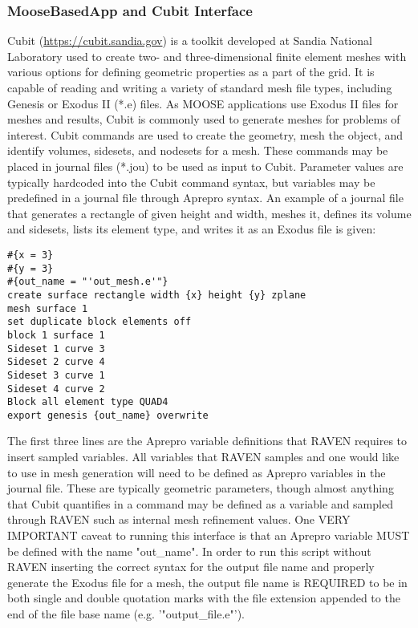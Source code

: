 \subsubsection{MooseBasedApp and Cubit Interface}
Cubit (\url{https://cubit.sandia.gov}) is a toolkit developed at Sandia National 
Laboratory used to create two- and three-dimensional finite element meshes with 
various options for defining geometric properties as a part of the grid. It is 
capable of reading and writing a variety of standard mesh file types, including 
Genesis or Exodus II (*.e) files.  As MOOSE applications use Exodus II files for 
meshes and results, Cubit is commonly used to generate meshes for problems of 
interest.  Cubit commands are used to create the geometry, mesh the object, and 
identify volumes, sidesets, and nodesets for a mesh.  These commands may be 
placed in journal files (*.jou) to be used as input to Cubit.  Parameter values 
are typically hardcoded into the Cubit command syntax, but variables may be 
predefined in a journal file through Aprepro syntax.  An example of a journal 
file that generates a rectangle of given height and width, meshes it, defines its 
volume and sidesets, lists its element type, and writes it as an Exodus file is given:

\begin{lstlisting}
#{x = 3}
#{y = 3}
#{out_name = "'out_mesh.e'"}
create surface rectangle width {x} height {y} zplane
mesh surface 1
set duplicate block elements off
block 1 surface 1
Sideset 1 curve 3
Sideset 2 curve 4
Sideset 3 curve 1
Sideset 4 curve 2
Block all element type QUAD4
export genesis {out_name} overwrite
\end{lstlisting}

The first three lines are the Aprepro variable definitions that RAVEN requires to 
insert sampled variables.  All variables that RAVEN samples and one would like to 
use in mesh generation will need to be defined as Aprepro variables in the journal 
file.  These are typically geometric parameters, though almost anything that Cubit 
quantifies in a command may be defined as a variable and sampled through RAVEN 
such as internal mesh refinement values.  One VERY IMPORTANT caveat to running 
this interface is that an Aprepro variable MUST be defined with the name "out\_name". 
In order to run this script without RAVEN inserting the correct syntax for the 
output file name and properly generate the Exodus file for a mesh, the output file 
name is REQUIRED to be in both single and double quotation marks with the file 
extension appended to the end of the file base name (e.g. '"output\_file.e"').  

